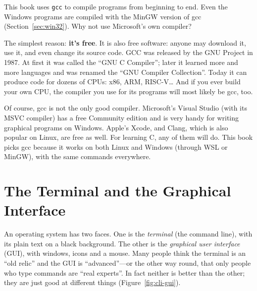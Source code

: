 This book uses \texttt{gcc} to compile programs from beginning to end. Even the Windows programs are compiled with the MinGW version of gcc (Section~\ref{sec:win32}). Why not use Microsoft's own compiler?

The simplest reason: \textbf{it's free}. It is also free software: anyone may download it, use it, and even change its source code. GCC was released by the GNU Project in 1987. At first it was called the ``GNU C Compiler''; later it learned more and more languages and was renamed the ``GNU Compiler Collection''. Today it can produce code for dozens of CPUs: x86, ARM, RISC-V\ldots{} And if you ever build your own CPU, the compiler you use for its programs will most likely be gcc, too.

Of course, gcc is not the only good compiler. Microsoft's Visual Studio (with its MSVC compiler) has a free Community edition and is very handy for writing graphical programs on Windows. Apple's Xcode, and Clang, which is also popular on Linux, are free as well. For learning C, any of them will do. This book picks gcc because it works on both Linux and Windows (through WSL or MinGW), with the same commands everywhere.

\section{The Terminal and the Graphical Interface}

An operating system has two faces. One is the \emph{terminal} (the command line), with its plain text on a black background. The other is the \emph{graphical user interface} (GUI), with windows, icons and a mouse. Many people think the terminal is an ``old relic'' and the GUI is ``advanced''---or the other way round, that only people who type commands are ``real experts''. In fact neither is better than the other; they are just good at different things (Figure~\ref{fig:cli-gui}).


